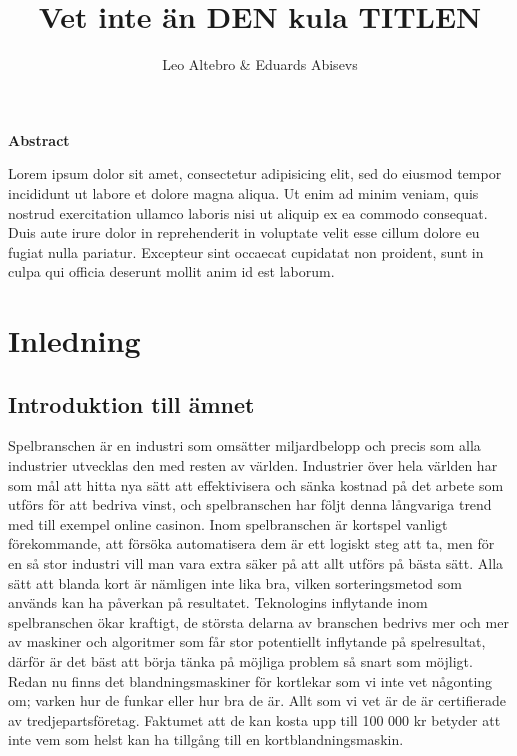 \documentclass[swedish,a4paper]{article}
\title{Vet inte än DEN kula TITLEN}
\author{Leo Altebro & Eduards Abisevs}
\begin{document}


\begin{center}
    \large
    \vspace{0.9cm}
    \textbf{Abstract}
    \vspace{0.9cm}
\end{center}
Lorem ipsum dolor sit amet, consectetur adipisicing elit, sed do eiusmod tempor incididunt ut labore et dolore magna aliqua. Ut enim ad minim veniam, quis nostrud exercitation ullamco laboris nisi ut aliquip ex ea commodo consequat. Duis aute irure dolor in reprehenderit in voluptate velit esse cillum dolore eu fugiat nulla pariatur. Excepteur sint occaecat cupidatat non proident, sunt in culpa qui officia deserunt mollit anim id est laborum.

\tableofcontents
\newpage

\glsaddall[] %
\printglossaries %
\newpage

\section{Inledning}
\subsection{Introduktion till ämnet}
Spelbranschen är en industri som omsätter miljardbelopp och precis som alla
industrier utvecklas den med resten av världen. Industrier över hela världen har
som mål att hitta nya sätt att effektivisera och sänka kostnad på det arbete som
utförs för att bedriva vinst, och spelbranschen har följt denna långvariga trend
med till exempel online casinon. Inom spelbranschen är kortspel vanligt
förekommande, att försöka automatisera dem är ett logiskt steg att ta, men för
en så stor industri vill man vara extra säker på att allt utförs på bästa sätt.
Alla sätt att blanda kort är nämligen inte lika bra, vilken sorteringsmetod som
används kan ha påverkan på resultatet. Teknologins inflytande inom spelbranschen
ökar kraftigt, de största delarna av branschen bedrivs mer och mer av maskiner
och algoritmer som får stor potentiellt inflytande på spelresultat, därför är
det bäst att börja tänka på möjliga problem så snart som möjligt. Redan nu finns
det blandningsmaskiner för kortlekar som vi inte vet någonting om; varken hur de
funkar eller hur bra de är. Allt som vi vet är de är certifierade av
tredjepartsföretag. Faktumet att de kan kosta upp till 100 000 kr betyder att
inte vem som helst kan ha tillgång till en kortblandningsmaskin.
\end{document}
